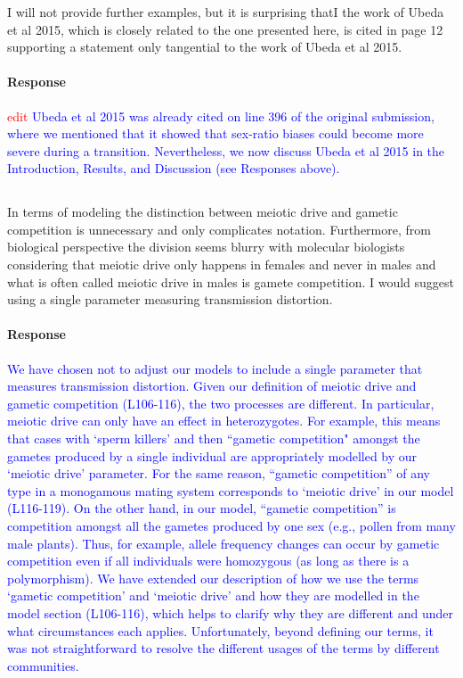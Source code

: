 \documentclass[10pt,letterpaper]{article}
\begin{document}
\noindent\subsubsection{}
I will not provide further examples, but it is surprising thatI the work of Ubeda et al 2015, which is closely related to the one presented here, is cited in page 12 supporting a statement only tangential to the work of Ubeda et al 2015.

\noindent\paragraph{Response}
\textcolor{red}{edit}
\textcolor{blue}{Ubeda et al 2015 was already cited on line 396 of the original submission, where we mentioned that it showed that sex-ratio biases could become more severe during a transition.
Nevertheless, we now discuss Ubeda et al 2015 in the Introduction, Results, and Discussion (see Responses above).}

\noindent\subsection{}
In terms of modeling the distinction between meiotic drive and gametic competition is unnecessary and only complicates notation. Furthermore, from biological perspective the division seems blurry with molecular biologists considering that meiotic drive only happens in females and never in males and what is often called meiotic drive in males is gamete competition. I would suggest using a single parameter measuring transmission distortion.

\noindent\paragraph{Response}
\textcolor{blue}{
We have chosen not to adjust our models to include a single parameter that measures transmission distortion. 
Given our definition of meiotic drive and gametic competition (L106-116), the two processes are different.
In particular, meiotic drive can only have an effect in heterozygotes.
For example, this means that cases with `sperm killers' and then ``gametic competition" amongst the gametes produced by a single individual are appropriately modelled by our `meiotic drive' parameter. 
For the same reason, ``gametic competition'' of any type in a monogamous mating system corresponds to `meiotic drive' in our model (L116-119). 
On the other hand, in our model, ``gametic competition'' is competition amongst all the gametes produced by one sex (e.g., pollen from many male plants).
Thus, for example, allele frequency changes can occur by gametic competition even if all individuals were homozygous (as long as there is a polymorphism).
We have extended our description of how we use the terms `gametic competition' and `meiotic drive' and how they are modelled in the model section (L106-116), which helps to clarify why they are different and under what circumstances each applies. 
Unfortunately, beyond defining our terms, it was not straightforward to resolve the different usages of the terms by different communities.
}
\end{document}
